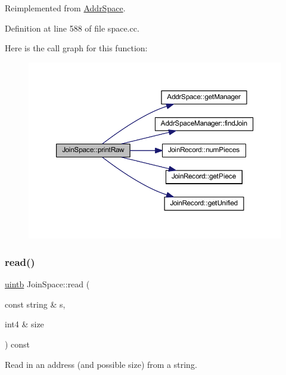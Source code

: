 Reimplemented from \mbox{\hyperlink{class_addr_space_a76819b70cd6b6ae8601ac1821f86b929}{Addr\+Space}}.



Definition at line 588 of file space.\+cc.

Here is the call graph for this function\+:
\nopagebreak
\begin{figure}[H]
\begin{center}
\leavevmode
\includegraphics[width=350pt]{class_join_space_a23032ea3a76390d697779a99d15c75c8_cgraph}
\end{center}
\end{figure}
\mbox{\label{class_join_space_a8f644b1eaf92bece425a3712a205fa3b}} 
\subsubsection{\texorpdfstring{read()}{read()}}
{\footnotesize\ttfamily \mbox{\hyperlink{types_8h_a2db313c5d32a12b01d26ac9b3bca178f}{uintb}} Join\+Space\+::read (\begin{DoxyParamCaption}\item[{const string \&}]{s,  }\item[{int4 \&}]{size }\end{DoxyParamCaption}) const\hspace{0.3cm}{\ttfamily [virtual]}}



Read in an address (and possible size) from a string. 

